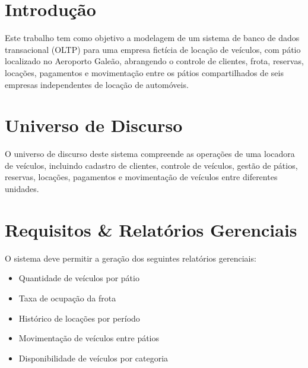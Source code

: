 \documentclass[12pt,a4paper]{article}
\begin{document}
\section{Introdu\c{c}\~ao}

Este trabalho tem como objetivo a modelagem de um sistema de banco de dados transacional (OLTP) para uma empresa fict\'icia de loca\c{c}\~ao de ve\'iculos, com p\'atio localizado no Aeroporto Gale\~ao, abrangendo o controle de clientes, frota, reservas, loca\c{c}\~oes, pagamentos e movimenta\c{c}\~ao entre os p\'atios compartilhados de seis empresas independentes de loca\c{c}\~ao de autom\'oveis.

\section{Universo de Discurso}

O universo de discurso deste sistema compreende as opera\c{c}\~oes de uma locadora de ve\'iculos, incluindo cadastro de clientes, controle de ve\'iculos, gest\~ao de p\'atios, reservas, loca\c{c}\~oes, pagamentos e movimenta\c{c}\~ao de ve\'iculos entre diferentes unidades.

\section{Requisitos \& Relat\'orios Gerenciais}

O sistema deve permitir a gera\c{c}\~ao dos seguintes relat\'orios gerenciais:

\begin{itemize}
  \item Quantidade de ve\'iculos por p\'atio
  \item Taxa de ocupa\c{c}\~ao da frota
  \item Hist\'orico de loca\c{c}\~oes por per\'iodo
  \item Movimenta\c{c}\~ao de ve\'iculos entre p\'atios
  \item Disponibilidade de ve\'iculos por categoria
\end{itemize}
\end{document}
